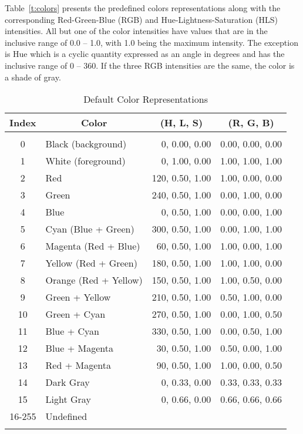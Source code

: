 Table~\ref{t:colors} presents the predefined colors representations
along with the corresponding Red-Green-Blue (RGB) and
Hue-Lightness-Saturation (HLS) intensities.
All but one of the color intensities have values that are in
the inclusive range of 0.0 -- 1.0, with 1.0 being the maximum intensity.
The exception is Hue which is a cyclic quantity expressed as an angle in
degrees and has the inclusive range of 0 -- 360.
If the three RGB intensities are the same, the color is a shade of gray.
\begin{table}[htb]
  \caption{Default Color Representations}
  \centering
  \begin{tabular}{|c|l|r|r|} \hline\hline
    \multicolumn{1}{|c|}{Index} & \multicolumn{1}{c|}{Color} &
    \multicolumn{1}{|c|}{(H, L, S)} & \multicolumn{1}{c|}{(R, G, B)} \\ \hline
    &&& \\
     0 & Black (background)    &   0, 0.00, 0.00  &  0.00, 0.00, 0.00 \\
     1 & White (foreground)    &   0, 1.00, 0.00  &  1.00, 1.00, 1.00 \\
     2 & Red                   & 120, 0.50, 1.00  &  1.00, 0.00, 0.00 \\
     3 & Green                 & 240, 0.50, 1.00  &  0.00, 1.00, 0.00 \\
     4 & Blue                  &   0, 0.50, 1.00  &  0.00, 0.00, 1.00 \\
     5 & Cyan (Blue + Green)   & 300, 0.50, 1.00  &  0.00, 1.00, 1.00 \\
     6 & Magenta (Red + Blue)  &  60, 0.50, 1.00  &  1.00, 0.00, 1.00 \\
     7 & Yellow (Red + Green)  & 180, 0.50, 1.00  &  1.00, 1.00, 0.00 \\
     8 & Orange (Red + Yellow) & 150, 0.50, 1.00  &  1.00, 0.50, 0.00 \\
     9 & Green + Yellow        & 210, 0.50, 1.00  &  0.50, 1.00, 0.00 \\
    10 & Green + Cyan          & 270, 0.50, 1.00  &  0.00, 1.00, 0.50 \\
    11 & Blue + Cyan           & 330, 0.50, 1.00  &  0.00, 0.50, 1.00 \\
    12 & Blue + Magenta        &  30, 0.50, 1.00  &  0.50, 0.00, 1.00 \\
    13 & Red + Magenta         &  90, 0.50, 1.00  &  1.00, 0.00, 0.50 \\
    14 & Dark Gray             &   0, 0.33, 0.00  &  0.33, 0.33, 0.33 \\
    15 & Light Gray            &   0, 0.66, 0.00  &  0.66, 0.66, 0.66 \\
    16-255 & Undefined & & \\
    &&& \\ \hline\hline
\end{tabular}
\end{table}

